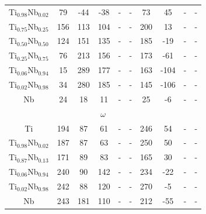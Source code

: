 \begin{longtable}[H]{ c c c c c c c c c c }
	Ti$_{0.98}$Nb$_{0.02}$ & 79 & -44 & -38 & - & - & 73 & 45 & - & - \\
	Ti$_{0.75}$Nb$_{0.25}$ & 156 & 113 & 104 & - & - & 200 & 13 & - & - \\
	Ti$_{0.50}$Nb$_{0.50}$ & 124 & 151 & 135 & - & - & 185 & -19 & - & - \\
	Ti$_{0.25}$Nb$_{0.75}$ & 76 & 213 & 156 & - & - & 173 & -61 & - & - \\
	Ti$_{0.06}$Nb$_{0.94}$ & 15 & 289 & 177 & - & - & 163 & -104 & - & - \\
	Ti$_{0.02}$Nb$_{0.98}$ & 34 & 280 & 185 & - & - & 145 & -106 & - & - \\
	Nb & 24 & 18 & 11 & - & - & 25 & -6 & - & - \\
	\hline
	\multicolumn{10}{c}{$\omega$}\\
	Ti & 194 & 87 & 61 & - & - & 246 & 54 & - & - \\
	Ti$_{0.98}$Nb$_{0.02}$ & 187 & 87 & 63 & - & - & 250 & 50 & - & - \\
	Ti$_{0.87}$Nb$_{0.13}$ & 171 & 89 & 83 & - & - & 165 & 30 & - & - \\
	Ti$_{0.06}$Nb$_{0.94}$ & 240 & 90 & 142 & - & - & 234 & -22 & - & - \\
	Ti$_{0.02}$Nb$_{0.98}$ & 242 & 88 & 120 & - & - & 270 & -5 & - & - \\
	Nb & 243 & 181 & 110 & - & - & 212 & -55 & - & - \\
	\hline
\end{longtable}


